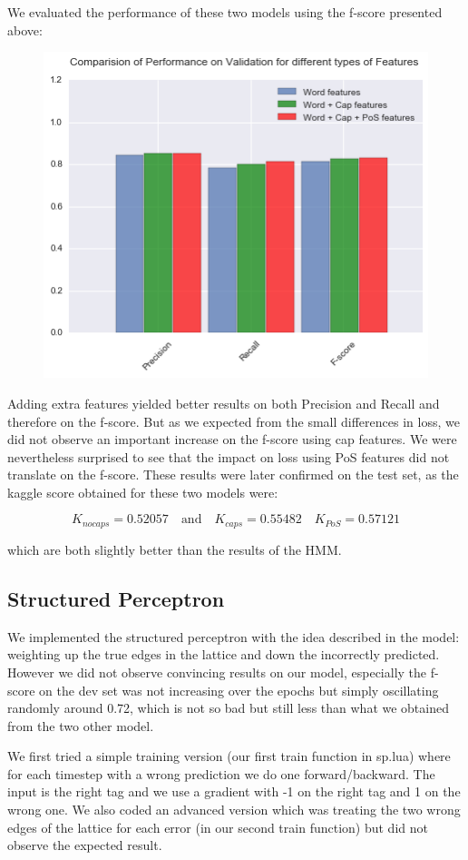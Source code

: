 \documentclass[11pt]{article}
\begin{document}
We evaluated the performance of these two models using the f-score presented above:

\begin{figure}[H]
\centering
\includegraphics[width=0.6\linewidth]{prf_cap}
\end{figure}

Adding extra features yielded better results on both Precision and Recall and therefore on the f-score. But as we expected from the small differences in loss, we did not observe an important increase on the f-score using cap features. We were nevertheless surprised to see that the impact on loss using PoS features did not translate on the f-score. These results were later confirmed on the test set, as the kaggle score obtained for these two models were:

$$K_{no caps} = 0.52057 \quad \text{and} \quad K_{caps} = 0.55482 \quad K_{PoS} = 0.57121$$

which are both slightly better than the results of the HMM.

\subsection{Structured Perceptron}

We implemented the structured perceptron with the idea described in the model: weighting up the true edges in the lattice and down the incorrectly predicted. However we did not observe convincing results on our model, especially the f-score on the dev set was not increasing over the epochs but simply oscillating randomly around 0.72, which is not so bad but still less than what we obtained from the two other model.

We first tried a simple training version (our first train function in sp.lua) where for each timestep with a wrong prediction we do one forward/backward. The input is the right tag and we use a gradient with -1 on the right tag and 1 on the wrong one. We also coded an advanced version which was treating the two wrong edges of the lattice for each error (in our second train function) but did not observe the expected result.
\end{document}
